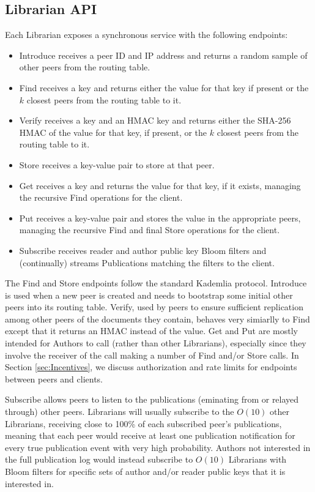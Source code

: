 \documentclass[10pt]{article}
\begin{document}
\subsection{Librarian API}
\label{sec:API}
Each Librarian exposes a synchronous service with the following endpoints:
\begin{itemize}
	\item Introduce receives a peer ID and IP address and returns a random sample of other peers from the routing table.
	\item Find receives a key and returns either the value for that key if present or the $k$ closest peers from the routing table to it.
	\item Verify receives a key and an HMAC key and returns either the SHA-256 HMAC of the value for that key, if present, or the $k$ closest peers from the routing table to it.
	\item Store receives a key-value pair to store at that peer.
	\item Get receives a key and returns the value for that key, if it exists, managing the recursive Find operations for the client.
	\item Put receives a key-value pair and stores the value in the appropriate peers, managing the recursive Find and final Store operations for the client.
	\item Subscribe receives reader and author public key Bloom filters and (continually) streams Publications matching the filters to the client.
\end{itemize}

The Find and Store endpoints follow the standard Kademlia protocol. Introduce is used when a new peer is created and needs to bootstrap some initial other peers into its routing table. Verify, used by peers to ensure sufficient replication among other peers of the documents they contain, behaves very simiarlly to Find except that it returns an HMAC instead of the value. Get and Put are mostly intended for Authors to call (rather than other Librarians), especially since they involve the receiver of the call making a number of Find and/or Store calls. In Section \ref{sec:Incentives}, we discuss authorization and rate limits for endpoints between peers and clients.

Subscribe allows peers to listen to the publications (eminating from or relayed through) other peers. Librarians will usually subscribe to the $O(10)$ other Librarians, receiving close to 100\% of each subscribed peer's publications, meaning that each peer would receive at least one publication notification for every true publication event with very high probability. Authors not interested in the full publication log would instead subscribe to $O(10)$ Librarians with Bloom filters for specific sets of author and/or reader public keys that it is interested in.
\end{document}
